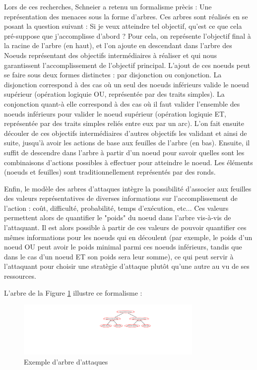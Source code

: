 		Lors de ces recherches, Schneier a retenu un formalisme prècis : Une représentation des menaces sous la forme d'arbres. Ces arbres sont réalisés en se posant la question suivant : Si je veux atteindre tel objectif, qu'est ce que cela pré-suppose que j'accomplisse d'abord ? Pour cela, on représente l'objectif final à la racine de l'arbre (en haut), et l'on ajoute en descendant dans l'arbre des Noeuds représentant des objectifs intermédiaires à réaliser et qui nous garantissent l'accomplissement de l'objectif principal. L'ajout de ces noeuds peut se faire sous deux formes distinctes : par disjonction ou conjonction. La disjonction correspond à des cas où un seul des noeuds inférieurs valide le noeud supérieur (opération logiquie OU, représentée par des traits simples). La conjonction quant-à elle correspond à des cas où il faut valider l'ensemble des noeuds inférieurs pour valider le noeud supérieur (opération logiquie ET, représentée par des traits simples reliés entre eux par un arc). L'on fait ensuite découler de ces objectifs intermédiaires d'autres objectifs les validant et ainsi de suite, jusqu'à avoir les actions de base aux feuilles de l'arbre (en bas). Ensuite, il suffit de descendre dans l'arbre à partir d'un noeud pour savoir quelles sont les combinaisons d'actions possibles à effectuer pour atteindre le noeud. Les éléments (noeuds et feuilles) sont traditionnellement représentés par des ronds.

		Enfin, le modèle des arbres d'attaques intègre la possibilité d'associer aux feuilles des valeurs représentatives de diverses informations sur l'accomplissement de l'action : coût, difficulté, probabilité, temps d'exécution, etc... Ces valeurs permettent alors de quantifier le "poids" du noeud dans l'arbre vis-à-vis de l'attaquant.  Il est alors possible à partir de ces valeurs de pouvoir quantifier ces mêmes informations pour les noeuds qui en découlent (par exemple, le poids d'un noeud OU peut avoir le poids minimal parmi ces noeuds inférieurs, tandis que dans le cas d'un noeud ET son poids sera leur somme), ce qui peut servir à l'attaquant pour choisir une stratègie d'attaque plutôt qu'une autre au vu de ses ressources.

		L'arbre de la Figure \ref{fig:arbre_exemple_1} illustre ce formalisme : 

		\begin{figure}
			\begin{center}
				\includegraphics[width=0.8\textwidth]{figure/exemple1_rapport.png}
			\end{center}
			\caption{Exemple d'arbre d'attaques}
			\label{fig:arbre_exemple_1}
		\end{figure}

